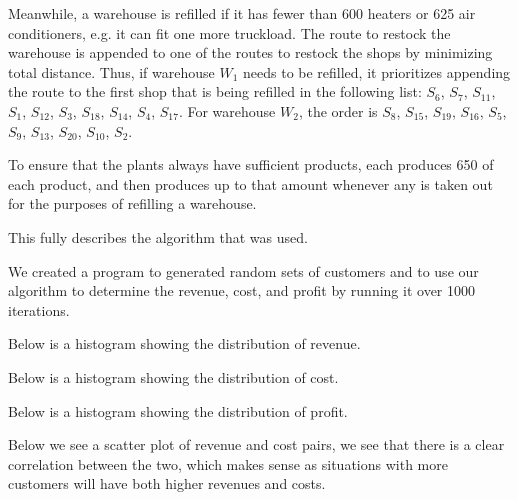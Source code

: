 \begin{paper}
Meanwhile, a warehouse is refilled if it has fewer than 600 heaters or 625 air conditioners, e.g. it can fit one more truckload.
The route to restock the warehouse is appended to one of the routes to restock the shops by minimizing total distance.
Thus, if warehouse $W_1$ needs to be refilled, it prioritizes appending the route to the first shop that is being refilled in the following list: $S_6$, $S_7$, $S_{11}$, $S_1$, $S_{12}$, $S_3$, $S_{18}$, $S_{14}$, $S_4$, $S_{17}$.
For warehouse $W_2$, the order is $S_8$, $S_{15}$, $S_{19}$, $S_{16}$, $S_5$, $S_9$, $S_{13}$, $S_{20}$, $S_{10}$, $S_2$.

To ensure that the plants always have sufficient products, each produces 650 of each product, and then produces up to that amount whenever any is taken out for the purposes of refilling a warehouse.

This fully describes the algorithm that was used.


We created a program to generated random sets of customers and to use our algorithm to determine
the revenue, cost, and profit by running it over 1000 iterations.

Below is a histogram showing the distribution of revenue.


Below is a histogram showing the distribution of cost.


Below is a histogram showing the distribution of profit.


Below we see a scatter plot of revenue and cost pairs, we see that there is a clear correlation between the two, which makes sense as situations with more customers will have both higher revenues and costs.



\end{paper}
